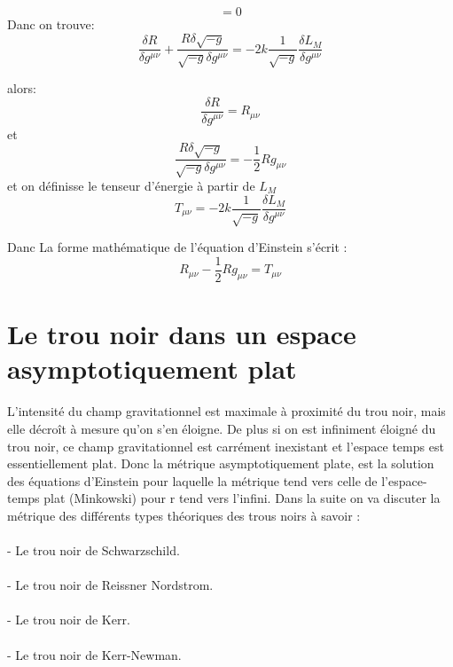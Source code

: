 \documentclass[12pt,  a4paper, openright]{report} %
\begin{document}
	$$=0$$
	Danc on trouve:
	\begin{equation}
	\dfrac{\delta R}{\delta g^{\mu\nu}}+\dfrac{R\delta\sqrt{-g}}{\sqrt{-g}\delta g^{\mu\nu}}=-2k\dfrac{1}{\sqrt{-g}}\dfrac{\delta L_{M} }{\delta g^{\mu\nu}}
	\end{equation}
	
	alors:
	$$\dfrac{\delta R}{\delta g^{\mu\nu}}=R_{\mu\nu}$$ et $$\dfrac{R\delta\sqrt{-g}}{\sqrt{-g}\delta g^{\mu\nu}}=-\dfrac{1}{2}Rg_{\mu\nu}$$
	et on définisse le tenseur d'énergie à partir de $L_{M}$  $$T_{\mu\nu}=-2k\dfrac{1}{\sqrt{-g}}\dfrac{\delta L_{M} }{\delta g^{\mu\nu}}$$
	
	Danc La forme mathématique de l’équation d’Einstein s’écrit  :
	\begin{equation}
	R_{\mu\nu}-\dfrac{1}{2}Rg_{\mu\nu}=T_{\mu\nu}
	\end{equation}
	
	
	\section{Le trou noir dans un espace asymptotiquement plat}
	L’intensité du champ gravitationnel est maximale à proximité du trou noir, mais elle décroît
	à mesure qu’on s’en éloigne. De plus si on est infiniment éloigné du trou noir, ce champ gravitationnel est carrément inexistant et l’espace temps est essentiellement plat.
	Donc la métrique asymptotiquement plate, est la solution des équations d’Einstein pour laquelle
	la métrique tend vers celle de l’espace-temps plat (Minkowski) pour r tend vers l’infini.
	Dans la suite on va discuter la métrique des différents types théoriques des trous noirs à savoir :\\
	\\
	- Le trou noir de Schwarzschild.\\
	\\
	- Le trou noir de Reissner Nordstrom.\\
	\\
	- Le trou noir de Kerr.\\
	\\
	- Le trou noir de Kerr-Newman.
\end{document}
